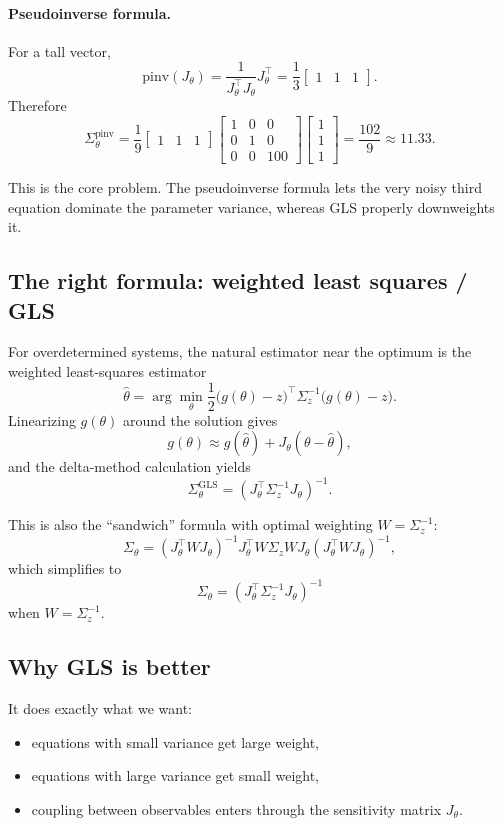 \documentclass[11pt]{article}
\begin{document}
\paragraph{Pseudoinverse formula.}
For a tall vector,
\[
\mathrm{pinv}(J_\theta) = \frac{1}{J_\theta^\top J_\theta}J_\theta^\top
= \frac{1}{3}\begin{bmatrix}1&1&1\end{bmatrix}.
\]
Therefore
\[
\Sigma_\theta^{\mathrm{pinv}}
=
\frac{1}{9}
\begin{bmatrix}1&1&1\end{bmatrix}
\begin{bmatrix}
1&0&0\\
0&1&0\\
0&0&100
\end{bmatrix}
\begin{bmatrix}
1\\1\\1
\end{bmatrix}
=
\frac{102}{9}
\approx 11.33.
\]

This is the core problem. The pseudoinverse formula lets the very noisy third equation dominate the parameter variance, whereas GLS properly downweights it.

\subsection*{The right formula: weighted least squares / GLS}
For overdetermined systems, the natural estimator near the optimum is the weighted least-squares estimator
\[
\hat{\theta}
=
\arg\min_\theta \frac{1}{2}\bigl(g(\theta)-z\bigr)^\top \Sigma_z^{-1}\bigl(g(\theta)-z\bigr).
\]
Linearizing $g(\theta)$ around the solution gives
\[
g(\theta) \approx g(\hat{\theta}) + J_\theta(\theta-\hat{\theta}),
\]
and the delta-method calculation yields
\[
\Sigma_\theta^{\mathrm{GLS}}
=
\left(J_\theta^\top \Sigma_z^{-1} J_\theta\right)^{-1}.
\]

This is also the ``sandwich'' formula with optimal weighting $W=\Sigma_z^{-1}$:
\[
\Sigma_\theta
=
(J_\theta^\top W J_\theta)^{-1}
J_\theta^\top W \Sigma_z W J_\theta
(J_\theta^\top W J_\theta)^{-1},
\]
which simplifies to
\[
\Sigma_\theta = (J_\theta^\top \Sigma_z^{-1}J_\theta)^{-1}
\]
when $W=\Sigma_z^{-1}$.

\subsection*{Why GLS is better}
It does exactly what we want:
\begin{itemize}
    \item equations with small variance get large weight,
    \item equations with large variance get small weight,
    \item coupling between observables enters through the sensitivity matrix $J_\theta$.
\end{itemize}
\end{document}
